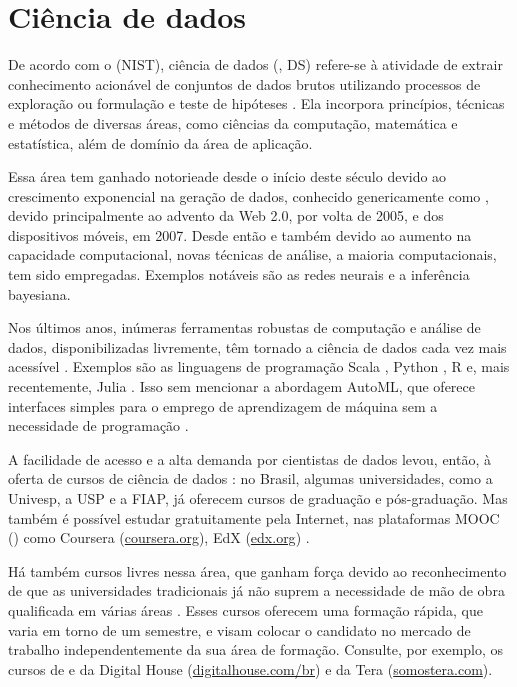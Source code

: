 \section{Ciência de dados}\label{sec:ds}

De acordo com o  (NIST), ciência de dados (, DS) refere-se à atividade de extrair conhecimento acionável de conjuntos de dados brutos utilizando processos de exploração ou formulação e teste de hipóteses \cite[p.~7]{NBDIF2015}.
Ela incorpora princípios, técnicas e métodos de diversas áreas, como ciências da computação, matemática e estatística, além de domínio da área de aplicação.

Essa área tem ganhado notorieade desde o início deste século devido ao crescimento exponencial na geração de dados, conhecido genericamente como , devido principalmente ao advento da Web 2.0, por volta de 2005, e dos dispositivos móveis, em 2007.
Desde então e também devido ao aumento na capacidade computacional, novas técnicas de análise, a maioria computacionais, tem sido empregadas.
Exemplos notáveis são as redes neurais e a inferência bayesiana.

Nos últimos anos, inúmeras ferramentas robustas de computação e análise de dados, disponibilizadas livremente, têm tornado a ciência de dados cada vez mais acessível \cite{Hayes2019}.
Exemplos são as linguagens de programação Scala \cite{Bugnion2016}, Python \cite{Nagpal2019}, R \cite{James2013} e, mais recentemente, Julia \cite{McNicholas2019}.
Isso sem mencionar a abordagem AutoML, que oferece interfaces simples para o emprego de aprendizagem de máquina sem a necessidade de programação \cite{He2020}.

A facilidade de acesso e a alta demanda por cientistas de dados levou, então, à oferta de cursos de ciência de dados \cite{Hassan2019}: no Brasil, algumas universidades, como a Univesp, a USP e a FIAP, já oferecem cursos de graduação e pós-graduação.
Mas também é possível estudar gratuitamente pela Internet, nas plataformas MOOC () como Coursera (\url{coursera.org}), EdX (\url{edx.org}) \etc.

Há também cursos livres nessa área, que ganham força devido ao reconhecimento de que as universidades tradicionais já não suprem a necessidade de mão de obra qualificada em várias áreas \cite{Zulauf2006}.
Esses cursos oferecem uma formação rápida, que varia em torno de um semestre, e visam colocar o candidato no mercado de trabalho independentemente da sua área de formação.
Consulte, por exemplo, os cursos de  e  da Digital House (\url{digitalhouse.com/br}) e da Tera (\url{somostera.com}).

